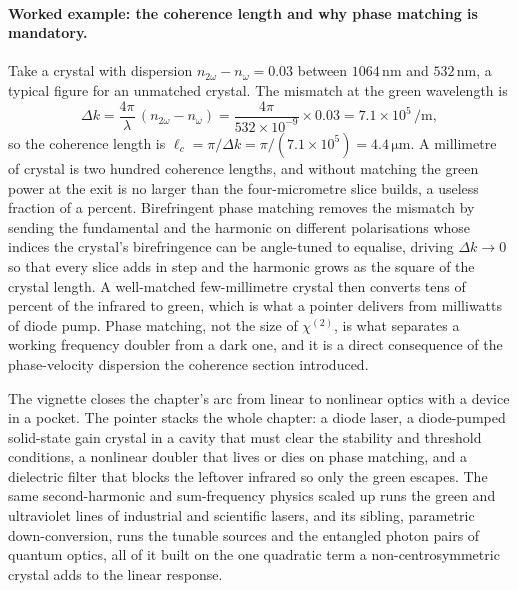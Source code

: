 \paragraph{Worked example: the coherence length and why phase matching is
mandatory.} Take a crystal with dispersion $n_{2\omega} - n_\omega = 0.03$
between $1064\,\si{\nano\meter}$ and $532\,\si{\nano\meter}$, a typical figure for
an unmatched crystal. The mismatch at the green wavelength is
\[
\Delta k = \frac{4\pi}{\lambda}\,(n_{2\omega} - n_\omega)
= \frac{4\pi}{532\times 10^{-9}}\times 0.03
= 7.1\times 10^{5}\,\si{\per\meter},
\]
so the coherence length is
$\ell_c = \pi/\Delta k = \pi/(7.1\times 10^{5}) = 4.4\,\si{\micro\meter}$. A
millimetre of crystal is two hundred coherence lengths, and without matching the
green power at the exit is no larger than the four-micrometre slice builds, a
useless fraction of a percent. Birefringent phase matching removes the mismatch by
sending the fundamental and the harmonic on different polarisations whose indices
the crystal's birefringence can be angle-tuned to equalise, driving
$\Delta k \to 0$ so that every slice adds in step and the harmonic grows as the
square of the crystal length. A well-matched few-millimetre crystal then converts
tens of percent of the infrared to green, which is what a pointer delivers from
milliwatts of diode pump. Phase matching, not the size of $\chi^{(2)}$, is what
separates a working frequency doubler from a dark one, and it is a direct
consequence of the phase-velocity dispersion the coherence section introduced.

The vignette closes the chapter's arc from linear to nonlinear optics with a
device in a pocket. The pointer stacks the whole chapter: a diode laser, a
diode-pumped solid-state gain crystal in a cavity that must clear the stability
and threshold conditions, a nonlinear doubler that lives or dies on phase
matching, and a dielectric filter that blocks the leftover infrared so only the
green escapes. The same second-harmonic and sum-frequency physics scaled up runs
the green and ultraviolet lines of industrial and scientific lasers, and its
sibling, parametric down-conversion, runs the tunable sources and the entangled
photon pairs of quantum optics, all of it built on the one quadratic term a
non-centrosymmetric crystal adds to the linear response.

